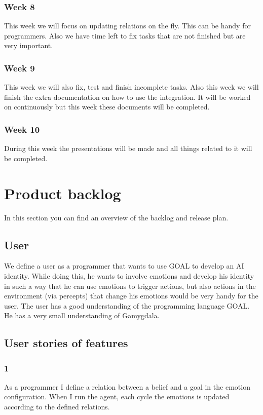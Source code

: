 \documentclass[]{article}
\begin{document}
\subsubsection*{Week 8}
This week we will focus on updating relations on the fly. This can be handy for programmers. Also we have time left to fix tasks that are not finished but are very important. 

\subsubsection*{Week 9}
This week we will also fix, test and finish incomplete tasks. Also this week we will finish the extra documentation on how to use the integration. It will be worked on continuously but this week these documents will be completed.

\subsubsection*{Week 10}
During this week the presentations will be made and all things related to it will be completed.

\section{Product backlog}
In this section you can find an overview of the backlog and release plan.
\subsection{User}
We define a user as a programmer that wants to use GOAL to develop an AI identity. While doing this, he wants to involve emotions and develop his identity in such a way that he can use emotions to trigger actions, but also actions in the environment (via percepts) that change his emotions would be very handy for the user. The user has a good understanding of the programming language GOAL. He has a very small understanding of Gamygdala.
\subsection{User stories of features}
\subsubsection*{1}
As a programmer I define a relation between a belief and a goal in the emotion configuration. When I run the agent, each cycle the emotions is updated according to the defined relations. 
\end{document}
